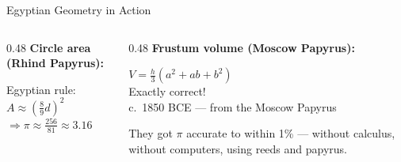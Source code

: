 \begin{frame}[shrink=16]{Egyptian Geometry in Action}

  \begin{columns}[T]
    \begin{column}{0.48\textwidth}
      \textbf{Circle area (Rhind Papyrus):}\\[0.3em]

      \vspace{0.3em}
      {\small Egyptian rule: $A \approx \left(\frac{8}{9}d\right)^2$\\
      $\Rightarrow \pi \approx \frac{256}{81} \approx 3.16$}
    \end{column}

    \begin{column}{0.48\textwidth}
      \textbf{Frustum volume (Moscow Papyrus):}\\[0.3em]

      \vspace{0.3em}
      {\small $V = \frac{h}{3}(a^2 + ab + b^2)$}\\[0.3em]
      {\small \textcolor{accentOrange}{Exactly correct!}\\
      c.\ 1850 BCE --- from the Moscow Papyrus}

      \vspace{0.5em}
      \begin{insightbox}
        They got $\pi$ accurate to within 1\% --- without calculus, without computers, using reeds and papyrus.
      \end{insightbox}
    \end{column}
  \end{columns}

\end{frame}

